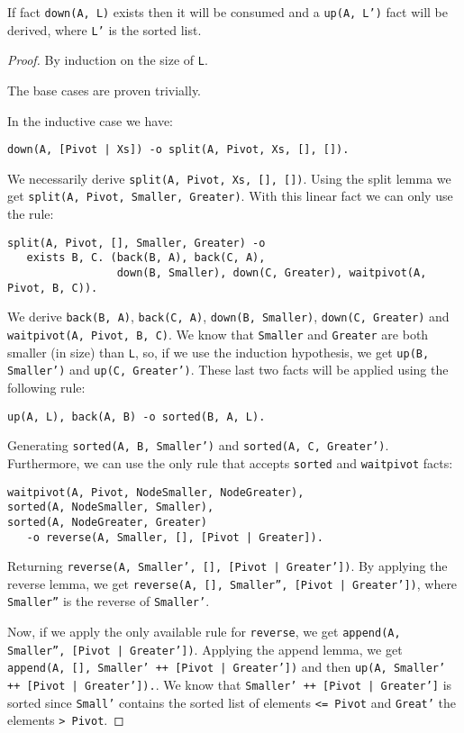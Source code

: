 \begin{theorem}
If fact \texttt{down(A, L)} exists then it will be consumed and a \texttt{up(A,
L')} fact will be derived, where \texttt{L'} is the sorted list.
\end{theorem}
\begin{proof}
By induction on the size of \texttt{L}.

The base cases are proven trivially.

In the inductive case we have:
\begin{Verbatim}[fontsize=\codesize]
down(A, [Pivot | Xs]) -o split(A, Pivot, Xs, [], []).
\end{Verbatim}

We necessarily derive \texttt{split(A, Pivot, Xs, [], [])}. Using the split
lemma we get \texttt{split(A, Pivot, Smaller, Greater)}. With this linear fact
we can only use the rule:

\begin{Verbatim}[fontsize=\codesize]
split(A, Pivot, [], Smaller, Greater) -o
   exists B, C. (back(B, A), back(C, A),
                 down(B, Smaller), down(C, Greater), waitpivot(A, Pivot, B, C)).
\end{Verbatim}

We derive \texttt{back(B, A)}, \texttt{back(C, A)}, \texttt{down(B, Smaller)},
\texttt{down(C, Greater)} and \texttt{waitpivot(A, Pivot, B, C)}. We know that
\texttt{Smaller} and \texttt{Greater} are both smaller (in size) than
\texttt{L}, so, if we use the induction hypothesis, we get \texttt{up(B,
Smaller')} and \texttt{up(C, Greater')}.  These last two facts will be applied
using the following rule:

\begin{Verbatim}[fontsize=\codesize]
up(A, L), back(A, B) -o sorted(B, A, L).
\end{Verbatim}

Generating \texttt{sorted(A, B, Smaller')} and \texttt{sorted(A, C, Greater')}.
Furthermore, we can use the only rule that accepts \texttt{sorted} and
\texttt{waitpivot} facts:

\begin{Verbatim}[fontsize=\codesize]
waitpivot(A, Pivot, NodeSmaller, NodeGreater),
sorted(A, NodeSmaller, Smaller),
sorted(A, NodeGreater, Greater)
   -o reverse(A, Smaller, [], [Pivot | Greater]).
\end{Verbatim}

Returning \texttt{reverse(A, Smaller', [], [Pivot | Greater'])}. By applying the
reverse lemma, we get \texttt{reverse(A, [], Smaller'', [Pivot | Greater'])},
where \texttt{Smaller''} is the reverse of \texttt{Smaller'}.

Now, if we apply the only available rule for \texttt{reverse}, we get
\texttt{append(A, Smaller'', [Pivot | Greater'])}. Applying the append lemma, we
get \texttt{append(A, [], Smaller' ++ [Pivot | Greater'])} and then
\texttt{up(A, Smaller' ++ [Pivot | Greater']).}. We know that \texttt{Smaller'
++ [Pivot | Greater']} is sorted since \texttt{Small'} contains the sorted list
of elements \texttt{<= Pivot} and \texttt{Great'} the elements \texttt{> Pivot}.

\end{proof}

